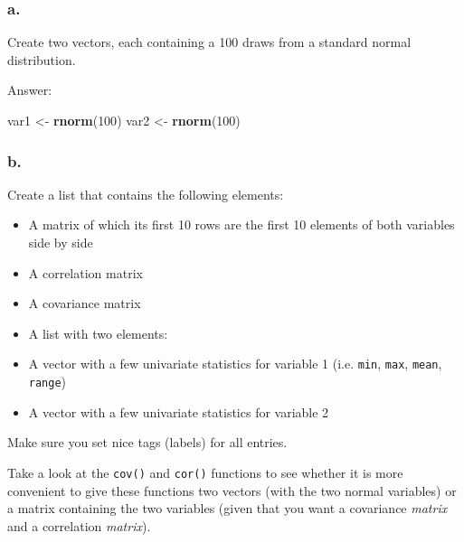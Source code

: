 \documentclass[]{article}
\newenvironment{Shaded}{\begin{snugshade}}{\end{snugshade}}
\newcommand{\DecValTok}[1]{\textcolor[rgb]{0.00,0.00,0.81}{#1}}
\newcommand{\KeywordTok}[1]{\textcolor[rgb]{0.13,0.29,0.53}{\textbf{#1}}}
\newcommand{\NormalTok}[1]{#1}
\newcommand{\StringTok}[1]{\textcolor[rgb]{0.31,0.60,0.02}{#1}}
\providecommand{\tightlist}{%
  \setlength{\itemsep}{0pt}\setlength{\parskip}{0pt}}
\begin{document}
\hypertarget{a.-1}{%
\subsubsection{a.}\label{a.-1}}

Create two vectors, each containing a 100 draws from a standard normal
distribution.

Answer:

\begin{Shaded}
\begin{Highlighting}[]
\NormalTok{var1 <-}\StringTok{ }\KeywordTok{rnorm}\NormalTok{(}\DecValTok{100}\NormalTok{)}
\NormalTok{var2 <-}\StringTok{ }\KeywordTok{rnorm}\NormalTok{(}\DecValTok{100}\NormalTok{)}
\end{Highlighting}
\end{Shaded}

\hypertarget{b.-1}{%
\subsubsection{b.}\label{b.-1}}

Create a list that contains the following elements:

\begin{itemize}
\tightlist
\item
  A matrix of which its first 10 rows are the first 10 elements of both
  variables side by side\\
\item
  A correlation matrix\\
\item
  A covariance matrix\\
\item
  A list with two elements:\\
\item
  A vector with a few univariate statistics for variable 1 (i.e.
  \texttt{min}, \texttt{max}, \texttt{mean}, \texttt{range})\\
\item
  A vector with a few univariate statistics for variable 2
\end{itemize}

Make sure you set nice tags (labels) for all entries.

Take a look at the \texttt{cov()} and \texttt{cor()} functions to see
whether it is more convenient to give these functions two vectors (with
the two normal variables) or a matrix containing the two variables
(given that you want a covariance \emph{matrix} and a correlation
\emph{matrix}).
\end{document}
